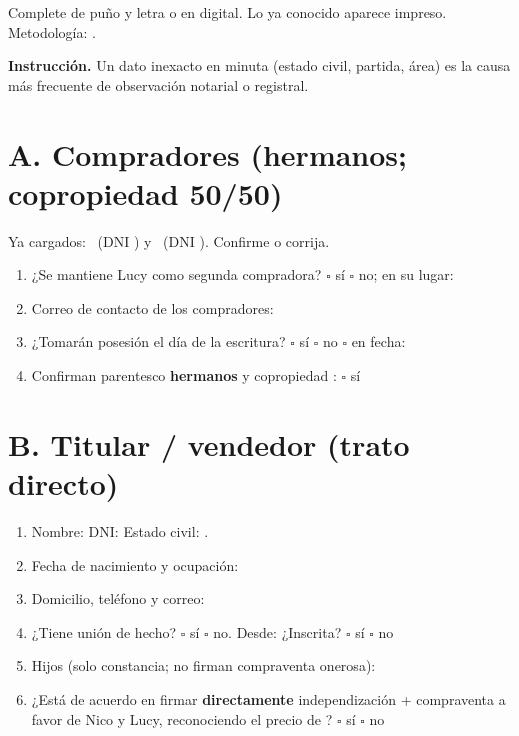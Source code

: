 \documentclass[12pt,a4paper]{article}
\begin{document}


\noindent Complete de puño y letra o en digital. Lo ya conocido aparece impreso. Metodología: \textbf{\Metodologia}.

\vspace{0.3em}
\noindent\textbf{Instrucción.} Un dato inexacto en minuta (estado civil, partida, área) es la causa más frecuente de observación notarial o registral.

\section*{A. Compradores (hermanos; copropiedad 50/50)}
{\small Ya cargados: \CompradorUnoNombre\ (DNI \CompradorUnoDNI) y \CompradorDosNombre\ (DNI \CompradorDosDNI). Confirme o corrija.}
\begin{enumerate}[leftmargin=1.15cm]
\item ¿Se mantiene Lucy como segunda compradora? \quad $\square$ sí \quad $\square$ no; en su lugar: \linea[11.2cm]
\item Correo de contacto de los compradores: \linea[10.5cm]
\item ¿Tomarán posesión el día de la escritura? \quad $\square$ sí \quad $\square$ no \quad $\square$ en fecha: \linea[3.5cm]
\item Confirman parentesco \textbf{hermanos} y copropiedad \PorcentajeCopropiedad: \quad $\square$ sí
\end{enumerate}

\section*{B. Titular / vendedor (trato directo)}
\begin{enumerate}[leftmargin=1.15cm]
\item Nombre: \textbf{\VendedorNombreCompleto} \quad DNI: \textbf{\VendedorDNI} \quad Estado civil: \textbf{\VendedorEstadoCivil}.
\item Fecha de nacimiento y ocupación: \linea[10.5cm]
\item Domicilio, teléfono y correo: \linea[10.8cm]
\item ¿Tiene unión de hecho? \quad $\square$ sí \quad $\square$ no. Desde: \linea[3.2cm] \quad ¿Inscrita? \quad $\square$ sí \quad $\square$ no
\item Hijos (solo constancia; no firman compraventa onerosa): \linea[8.6cm]
\item ¿Está de acuerdo en firmar \textbf{directamente} independización + compraventa a favor de Nico y Lucy, reconociendo el precio de \MontoPago? \quad $\square$ sí \quad $\square$ no
\end{enumerate}
\end{document}
